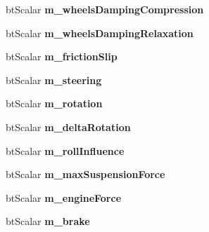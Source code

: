 \begin{DoxyCompactItemize}
\item 
\hypertarget{structbt_wheel_info_aa95b4d18939e3dfaab0485357b75ab9e}{bt\+Scalar {\bfseries m\+\_\+wheels\+Damping\+Compression}}\label{structbt_wheel_info_aa95b4d18939e3dfaab0485357b75ab9e}

\item 
\hypertarget{structbt_wheel_info_ac2407e9e6279841f2ad489743c9c706a}{bt\+Scalar {\bfseries m\+\_\+wheels\+Damping\+Relaxation}}\label{structbt_wheel_info_ac2407e9e6279841f2ad489743c9c706a}

\item 
\hypertarget{structbt_wheel_info_ac167547cd2ff3fcaf365ab8b7a5cbaf6}{bt\+Scalar {\bfseries m\+\_\+friction\+Slip}}\label{structbt_wheel_info_ac167547cd2ff3fcaf365ab8b7a5cbaf6}

\item 
\hypertarget{structbt_wheel_info_a88078127452fb67055486bcf2ce0dcf1}{bt\+Scalar {\bfseries m\+\_\+steering}}\label{structbt_wheel_info_a88078127452fb67055486bcf2ce0dcf1}

\item 
\hypertarget{structbt_wheel_info_a7b1d466dcadc5f0974dc47ccfb75f59a}{bt\+Scalar {\bfseries m\+\_\+rotation}}\label{structbt_wheel_info_a7b1d466dcadc5f0974dc47ccfb75f59a}

\item 
\hypertarget{structbt_wheel_info_abe9d7d4fac64c5117cdadf92d0fe5715}{bt\+Scalar {\bfseries m\+\_\+delta\+Rotation}}\label{structbt_wheel_info_abe9d7d4fac64c5117cdadf92d0fe5715}

\item 
\hypertarget{structbt_wheel_info_a9e75c6cdcee804e27278a5070d2489c6}{bt\+Scalar {\bfseries m\+\_\+roll\+Influence}}\label{structbt_wheel_info_a9e75c6cdcee804e27278a5070d2489c6}

\item 
\hypertarget{structbt_wheel_info_a77e9b0fb8f3d48972e97e7becf3a81a6}{bt\+Scalar {\bfseries m\+\_\+max\+Suspension\+Force}}\label{structbt_wheel_info_a77e9b0fb8f3d48972e97e7becf3a81a6}

\item 
\hypertarget{structbt_wheel_info_af89880607da34de2dd42bffa99a4ad0c}{bt\+Scalar {\bfseries m\+\_\+engine\+Force}}\label{structbt_wheel_info_af89880607da34de2dd42bffa99a4ad0c}

\item 
\hypertarget{structbt_wheel_info_aa7eb1ca21c125ece8160fe1c1b2e66cb}{bt\+Scalar {\bfseries m\+\_\+brake}}\label{structbt_wheel_info_aa7eb1ca21c125ece8160fe1c1b2e66cb}


\end{DoxyCompactItemize}
